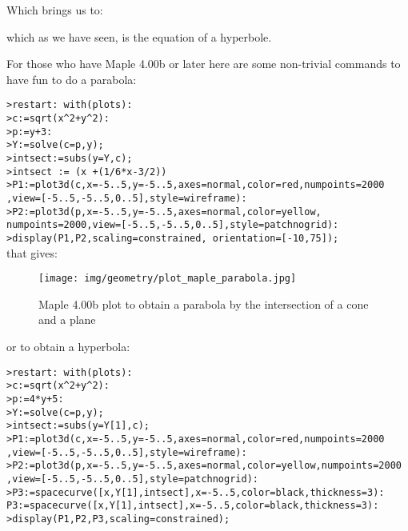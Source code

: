 \begin{enumerate}
\begin{tcolorbox}[title=Remark,colframe=black,arc=10pt]
		Which brings us to:
		
		which as we have seen, is the equation of a hyperbole.
		\end{tcolorbox}
		For those who have Maple 4.00b or later here are some non-trivial commands to have fun to do a parabola:
		
		\texttt{>restart: with(plots):}\\
		\texttt{>c:=sqrt(x\string^2+y\string^2):}\\
		\texttt{>p:=y+3:}\\
		\texttt{>Y:=solve(c=p,y);}\\
		\texttt{>intsect:=subs(y=Y,c);}\\
		\texttt{>intsect := (x +(1/6*x-3/2))}\\
		\texttt{>P1:=plot3d(c,x=-5..5,y=-5..5,axes=normal,color=red,numpoints=2000}
		\texttt{,view=[-5..5,-5..5,0..5],style=wireframe):}\\
		\texttt{>P2:=plot3d(p,x=-5..5,y=-5..5,axes=normal,color=yellow,}\\
		\texttt{numpoints=2000,view=[-5..5,-5..5,0..5],style=patchnogrid):}\\
		\texttt{>display(P1,P2,scaling=constrained, orientation=[-10,75]);}\\
		
		that gives:
		\begin{figure}[H]
			\centering
			\texttt{[image: img/geometry/plot\_maple\_parabola.jpg]}
			\caption{Maple 4.00b plot to obtain a parabola by the intersection of a cone and a plane}
		\end{figure}
		or to obtain a hyperbola:
		
		\texttt{>restart: with(plots):}\\
		\texttt{>c:=sqrt(x\string^2+y\string^2):}\\
		\texttt{>p:=4*y+5:}\\
		\texttt{>Y:=solve(c=p,y);}\\
		\texttt{>intsect:=subs(y=Y[1],c);}\\	\texttt{>P1:=plot3d(c,x=-5..5,y=-5..5,axes=normal,color=red,numpoints=2000}\\
		\texttt{,view=[-5..5,-5..5,0..5],style=wireframe):}\\	\texttt{>P2:=plot3d(p,x=-5..5,y=-5..5,axes=normal,color=yellow,numpoints=2000}\\
		\texttt{,view=[-5..5,-5..5,0..5],style=patchnogrid):}\\	\texttt{>P3:=spacecurve([x,Y[1],intsect],x=-5..5,color=black,thickness=3):}\\
	\texttt{P3:=spacecurve([x,Y[1],intsect],x=-5..5,color=black,thickness=3):}\\
		\texttt{>display(P1,P2,P3,scaling=constrained);}\\
		

\end{enumerate}
